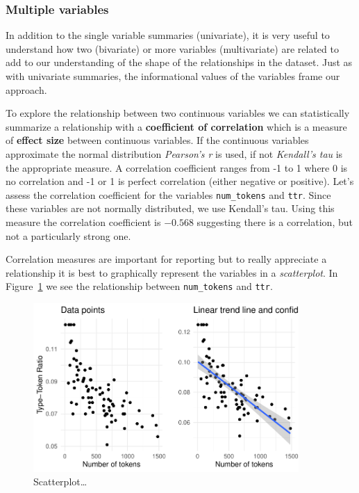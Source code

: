 \documentclass[
  letterpaper,
]{latex/krantz}
\begin{document}
\hypertarget{multiple-variables}{%
\subsubsection{Multiple variables}\label{multiple-variables}}

In addition to the single variable summaries (univariate), it is very
useful to understand how two (bivariate) or more variables
(multivariate) are related to add to our understanding of the shape of
the relationships in the dataset. Just as with univariate summaries, the
informational values of the variables frame our approach.

To explore the relationship between two continuous variables we can
statistically summarize a relationship with a \textbf{coefficient of
correlation} which is a measure of \textbf{effect size} between
continuous variables. If the continuous variables approximate the normal
distribution \emph{Pearson's r} is used, if not \emph{Kendall's tau} is
the appropriate measure. A correlation coefficient ranges from -1 to 1
where 0 is no correlation and -1 or 1 is perfect correlation (either
negative or positive). Let's assess the correlation coefficient for the
variables \texttt{num\_tokens} and \texttt{ttr}. Since these variables
are not normally distributed, we use Kendall's tau. Using this measure
the correlation coefficient is \(-0.568\) suggesting there is a
correlation, but not a particularly strong one.

Correlation measures are important for reporting but to really
appreciate a relationship it is best to graphically represent the
variables in a \emph{scatterplot}. In
Figure~\ref{fig-summaries-bivariate-scatterplot-belc} we see the
relationship between \texttt{num\_tokens} and \texttt{ttr}.

\begin{figure}[h]

{\centering \includegraphics[width=0.9\textwidth,height=\textheight]{./approaching-analysis_files/figure-pdf/fig-summaries-bivariate-scatterplot-belc-1.pdf}

}

\caption{\label{fig-summaries-bivariate-scatterplot-belc}Scatterplot\ldots{}}

\end{figure}
\end{document}
